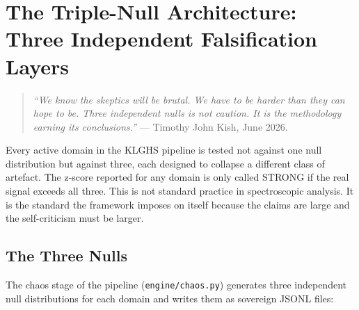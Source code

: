 \documentclass[11pt, letterpaper, openany]{book}
\begin{document}

\section{The Triple-Null Architecture: Three Independent Falsification Layers}

\begin{quote}
\textit{``We know the skeptics will be brutal. We have to be harder than they
can hope to be. Three independent nulls is not caution. It is the methodology
earning its conclusions.''} --- Timothy John Kish, June 2026.
\end{quote}

Every active domain in the KLGHS pipeline is tested not against one null
distribution but against three, each designed to collapse a different
class of artefact. The z-score reported for any domain is only called STRONG
if the real signal exceeds all three. This is not standard practice in
spectroscopic analysis. It is the standard the framework imposes on itself
because the claims are large and the self-criticism must be larger.

\subsection*{The Three Nulls}

The chaos stage of the pipeline (\texttt{engine/chaos.py}) generates three
independent null distributions for each domain and writes them as sovereign
JSONL files:
\end{document}
